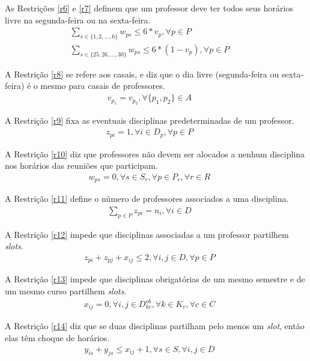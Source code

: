 As Restrições \ref{r6} e \ref{r7} definem que um professor deve ter todos seus horários livre na segunda-feira ou na sexta-feira.
\begin{eqnarray}
\label{r6}
\sum_{s\in\{{1, 2, ..., 6}\}}{w_{ps}} \leq 6*v_p, \forall{p \in{P}} &&\\
\label{r7}
\sum_{s\in\{{25, 26, ..., 30}\}}{w_{ps}} \leq 6*(1-v_p), \forall{p \in{P}} &&
\end{eqnarray}

A Restrição \ref{r8} se refere aos casais, e diz que o dia livre (segunda-feira ou sexta-feira) é o mesmo para casais de professores.
\begin{eqnarray}
\label{r8}
v_{p_1} = v_{p_2}, \forall{\{p_1,p_2\} \in{A}} &&
\end{eqnarray}

A Restrição \ref{r9} fixa as eventuais disciplinas predeterminadas de um professor.
\begin{eqnarray}
\label{r9}
z_{pi} = 1, \forall{i \in{D_p}}, \forall{p \in{P}} &&
\end{eqnarray}

A Restrição \ref{r10} diz que professores não devem ser alocados a nenhum disciplina nos horários das reuniões que participam.
\begin{eqnarray}
\label{r10}
w_{ps} = 0, \forall{s \in{S_r}}, \forall{p \in{P_r}}, \forall{r \in{R}} &&
\end{eqnarray}

A Restrição \ref{r11} define o número de professores associados a uma disciplina.
\begin{eqnarray}
\label{r11}
\sum_{p\in{P}}^{}{z_{pi}} = n_i, \forall{i}\in{D} &&
\end{eqnarray}

A Restrição \ref{r12} impede que disciplinas associadas a um professor partilhem \textit{slots}.
\begin{eqnarray}
\label{r12}
z_{pi} + z_{pj} + x_{ij} \leq 2, \forall{i,j}\in{D}, \forall{p}\in{P} &&
\end{eqnarray}

A Restrição \ref{r13} impede que disciplinas obrigatórias de um mesmo semestre e de um mesmo curso partilhem \textit{slots}.
\begin{eqnarray}
\label{r13}
x_{ij} = 0, \forall{i,j}\in{D_{kc}^{ob}}, \forall{k}\in{K_c}, \forall{c}\in{C} &&
\end{eqnarray}

A Restrição \ref{r14} diz que se duas disciplinas partilham pelo menos um \textit{slot}, então elas têm choque de horários.
\begin{eqnarray}
\label{r14}
y_{is} + y_{js} \leq x_{ij} + 1, \forall{s}\in{S}, \forall{i, j}\in{D} &&
\end{eqnarray}

